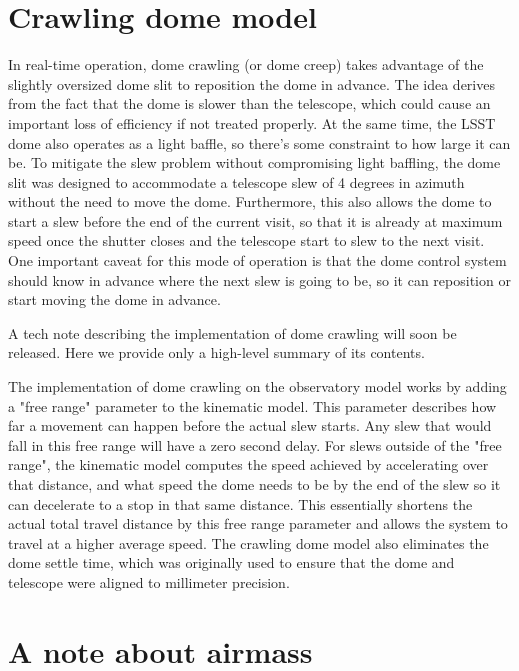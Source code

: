 \documentclass[DM,lsstdraft,authoryear,toc]{lsstdoc}
\begin{document}
\section{Crawling dome model}

In real-time operation, dome crawling (or dome creep) takes advantage of the slightly oversized dome slit to reposition the dome in advance.
The idea derives from the fact that the dome is slower than the telescope, which could cause an important loss of efficiency if not treated properly.
At the same time, the LSST dome also operates as a light baffle, so there's some constraint to how large it can be. To mitigate the slew problem
without compromising light baffling, the dome slit was designed to accommodate a telescope slew of 4 degrees in azimuth without the need to
move the dome. Furthermore, this also allows the dome to start a slew before the end of the current visit, so that it is already at maximum speed
once the shutter closes and the telescope start to slew to the next visit. One important caveat for this mode of operation is that the dome control
system should know in advance where the next slew is going to be, so it can reposition or start moving the dome in advance.

 A tech note describing the implementation of dome crawling will soon be released. Here we provide only a high-level summary of its contents.

The implementation of dome crawling on the observatory model works by adding a "free range" parameter to the kinematic model.
This parameter describes how far a movement can happen before the actual slew starts. Any slew that would fall in this free range will have a
zero second delay. For slews outside of the "free range", the kinematic model computes the speed achieved by accelerating over that distance,
and what speed the dome needs to be by the end of the slew so it can decelerate to a stop in that same distance. This essentially shortens the
actual total travel distance by this free range parameter and allows the system to travel at a higher average speed. The crawling dome model also
eliminates the dome settle time, which was originally used to ensure that the dome and telescope were aligned to millimeter precision.

\section{A note about airmass}
\end{document}
